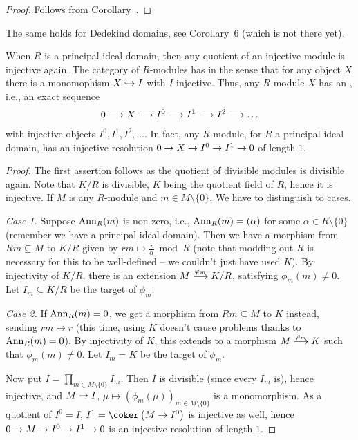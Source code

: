 \documentclass[a4paper,parskip=half,numbers=enddot, DIV=12]{scrreprt}
\begin{document}
\begin{proof}
	Follows from Corollary~.
\end{proof}
\begin{rem*}
	The same holds for Dedekind domains, see Corollary~6 (which is not there yet).
\end{rem*}
\begin{cor}
	When $R$ is a principal ideal domain, then any quotient of an injective module is injective again. The category of $R$-modules has  in the sense that for any object $X$ there is a monomophism $X\monomorphism I$ with $I$ injective. Thus, any $R$-module $X$ has an , i.e., an exact sequence
	\begin{align*}
	0\morphism X\morphism I^0\morphism I^1\morphism I^2\morphism\ldots
	\end{align*}
	with injective objects $I^0,I^1,I^2,\ldots$. In fact, any $R$-module, for $R$ a principal ideal domain, has an injective resolution $0\morphism X\morphism I^0\morphism I^1\morphism 0$ of length $1$.
\end{cor}
\begin{proof}
	The first assertion follows as the quotient of divisible modules is divisible again. Note that $K/R$ is divisible, $K$ being the quotient field of $R$, hence it is injective. If $M$ is any $R$-module and $m\in M\setminus\{0\}$. We have to distinguish to cases.
	
	\emph{Case 1.} Suppose $\operatorname{Ann}_R(m)$ is non-zero, i.e., $\operatorname{Ann}_R(m)=(\alpha)$ for some $\alpha\in R\setminus \{0\}$ (remember we have a principal ideal domain). Then we have a morphism from $Rm\subseteq M$ to $K/R$ given by $rm\mapsto \frac{r}{\alpha}\bmod R$ (note that modding out $R$ is necessary for this to be well-defined -- we couldn't just have used $K$). By injectivity of $K/R$, there is an extension $M\morphism[\phi_m]K/R$, satisfying $\phi_m(m)\neq 0$. Let $I_m\subseteq K/R$ be the target of $\phi_m$.
	
	\emph{Case 2.} If $\operatorname{Ann}_R(m)=0$, we get a morphism from $Rm\subseteq M$ to $K$ instead, sending $rm\mapsto r$ (this time, using $K$ doesn't cause problems thanks to $\operatorname{Ann}_R(m)=0$). By injectivity of $K$, this extends to a morphism $M\morphism[\phi_m]K$ such that $\phi_m(m)\neq0$. Let $I_m=K$ be the target of $\phi_m$.
	
	Now put $I=\prod_{m\in M\setminus\{0\}}I_m$. Then $I$ is divisible (since every $I_m$ is), hence injective, and $M\morphism I$, $\mu\mapsto\left(\phi_m(\mu)\right)_{m\in M\setminus\{0\}}$ is a monomorphism. As a quotient of $I^0=I$, $I^1=\coker\left(M\morphism I^0\right)$ is injective as well, hence $0\morphism M\morphism I^0\morphism I^1\morphism 0$ is an injective resolution of length $1$.
\end{proof}
\end{document}
